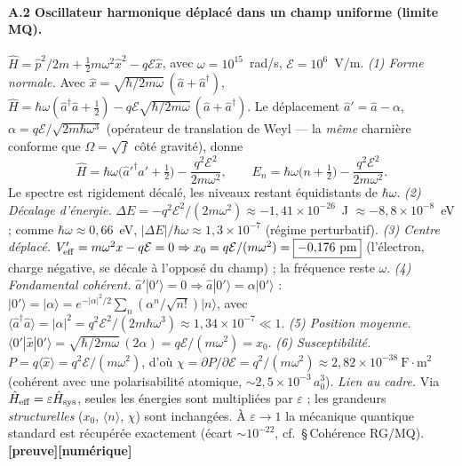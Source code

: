 \documentclass[11pt,a4paper]{article}
\newcommand{\st}[1]{\textbf{\textcolor{blue!45!black}{[#1]}}}
\begin{document}
\paragraph{A.2 Oscillateur harmonique déplacé dans un champ uniforme (limite MQ).}
$\hat H=\hat p^2/2m+\tfrac12 m\omega^2\hat x^2-q\mathcal{E}\hat x$, avec $\omega=10^{15}$~rad/s, $\mathcal{E}=10^{6}$~V/m.
\emph{(1) Forme normale.} Avec $\hat x=\sqrt{\hbar/2m\omega}\,(\hat a+\hat a^\dagger)$,
$\hat H=\hbar\omega(\hat a^\dagger\hat a+\tfrac12)-q\mathcal{E}\sqrt{\hbar/2m\omega}\,(\hat a+\hat a^\dagger)$. Le déplacement $\hat a'=\hat a-\alpha$, $\alpha=q\mathcal{E}/\sqrt{2m\hbar\omega^3}$ (opérateur de translation de Weyl --- la \emph{même} charnière conforme que $\Omega=\sqrt f$ côté gravité), donne
\begin{equation}
\hat H=\hbar\omega\Big(\hat a'^\dagger\hat a'+\tfrac12\Big)-\frac{q^2\mathcal{E}^2}{2m\omega^2},\qquad
E_n=\hbar\omega\Big(n+\tfrac12\Big)-\frac{q^2\mathcal{E}^2}{2m\omega^2}. \tag{A.2}
\end{equation}
Le spectre est rigidement décalé, les niveaux restant équidistants de $\hbar\omega$.
\emph{(2) Décalage d'énergie.} $\Delta E=-q^2\mathcal{E}^2/(2m\omega^2)\approx-1{,}41\times10^{-26}$~J $\approx-8{,}8\times10^{-8}$~eV ; comme $\hbar\omega\approx0{,}66$~eV, $|\Delta E|/\hbar\omega\approx1{,}3\times10^{-7}$ (régime perturbatif).
\emph{(3) Centre déplacé.} $V_{\rm eff}'=m\omega^2x-q\mathcal{E}=0\Rightarrow x_0=q\mathcal{E}/(m\omega^2)=\boxed{-0{,}176~\text{pm}}$ (l'électron, charge négative, se décale à l'opposé du champ) ; la fréquence reste $\omega$.
\emph{(4) Fondamental cohérent.} $\hat a'|0'\rangle=0\Rightarrow\hat a|0'\rangle=\alpha|0'\rangle$ : $|0'\rangle=|\alpha\rangle=e^{-|\alpha|^2/2}\sum_n(\alpha^n/\sqrt{n!})|n\rangle$, avec $\langle\hat a^\dagger\hat a\rangle=|\alpha|^2=q^2\mathcal{E}^2/(2m\hbar\omega^3)\approx\boxed{1{,}34\times10^{-7}}\ll1$.
\emph{(5) Position moyenne.} $\langle0'|\hat x|0'\rangle=\sqrt{\hbar/2m\omega}\,(2\alpha)=q\mathcal{E}/(m\omega^2)=x_0$.
\emph{(6) Susceptibilité.} $P=q\langle\hat x\rangle=q^2\mathcal{E}/(m\omega^2)$, d'où $\chi=\partial P/\partial\mathcal{E}=q^2/(m\omega^2)\approx\boxed{2{,}82\times10^{-38}~\text{F}\cdot\text{m}^2}$ (cohérent avec une polarisabilité atomique, $\sim2{,}5\times10^{-3}\,a_0^3$).
\emph{Lien au cadre.} Via $\hat H_{\rm eff}=\varepsilon\hat H_{\rm sys}$, seules les énergies sont multipliées par $\varepsilon$ ; les grandeurs \emph{structurelles} ($x_0$, $\langle n\rangle$, $\chi$) sont inchangées. À $\varepsilon\to1$ la mécanique quantique standard est récupérée exactement (écart $\sim10^{-22}$, cf.\ \S\,Cohérence RG/MQ). \st{preuve}\st{numérique}
\normalsize
\end{document}
